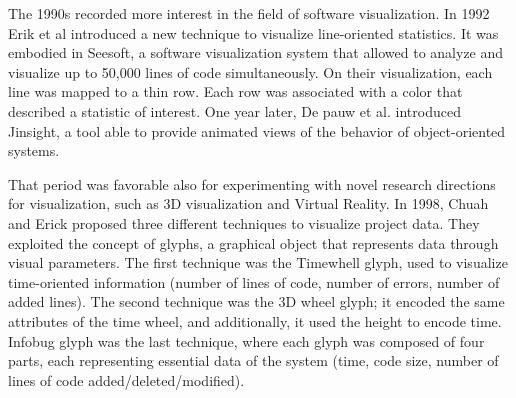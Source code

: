 The 1990s recorded more interest in the field of software visualization. 
In 1992 Erik et al \cite{Eick1992} introduced a new technique to visualize line-oriented statistics. 
It was embodied in Seesoft, a software visualization system that allowed to analyze and visualize up to 50,000 lines of code simultaneously. 
On their visualization, each line was mapped to a thin row. Each row was associated with a color that described a statistic of interest.
One year later, De pauw et al. \cite{DePauw1993} introduced Jinsight, a tool able to provide animated views of the behavior of object-oriented systems. 



That period was favorable also for experimenting with novel research directions for visualization, 
such as 3D visualization and Virtual Reality. 
In 1998, Chuah and Erick \cite{Chuah1998} proposed three different techniques to visualize project data. 
They exploited the concept of glyphs, a graphical object that represents data through visual parameters. 
The first technique was the Timewhell glyph, used to visualize time-oriented information (number of lines of code, number of errors, number of added lines). 
The second technique was the 3D wheel glyph; it encoded the same attributes of the time wheel, and additionally, it used the height to encode time. 
Infobug glyph was the last technique, where each glyph was composed of four parts, each representing essential data of the system (time, code size, number of lines of code added/deleted/modified). \newline


